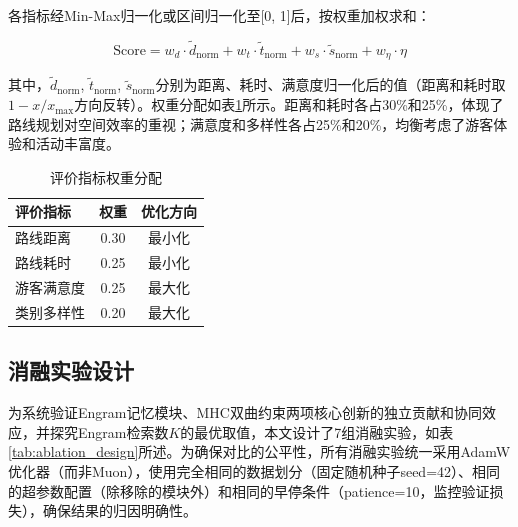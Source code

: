 \documentclass[12pt,a4paper]{ctexart}
\newenvironment{tighttable}
  {\setstretch{1.0}\small}
  {}
\begin{document}
各指标经Min-Max归一化或区间归一化至[0, 1]后，按权重加权求和：

\begin{equation}
\text{Score} = w_d\cdot\tilde{d}_{\text{norm}} + w_t\cdot\tilde{t}_{\text{norm}} + w_s\cdot\tilde{s}_{\text{norm}} + w_\eta\cdot\eta
\label{eq:composite}
\end{equation}

其中，$\tilde{d}_{\text{norm}}$, $\tilde{t}_{\text{norm}}$, $\tilde{s}_{\text{norm}}$分别为距离、耗时、满意度归一化后的值（距离和耗时取$1-x/x_{\max}$方向反转）。权重分配如表\ref{tab:weights}所示。距离和耗时各占30\%和25\%，体现了路线规划对空间效率的重视；满意度和多样性各占25\%和20\%，均衡考虑了游客体验和活动丰富度。

\begin{table}[H]
\centering
\caption{评价指标权重分配}
\label{tab:weights}
\begin{tighttable}
\begin{tabular}{lcc}
\toprule
评价指标 & 权重 & 优化方向 \\
\midrule
路线距离 & 0.30 & 最小化 \\
路线耗时 & 0.25 & 最小化 \\
游客满意度 & 0.25 & 最大化 \\
类别多样性 & 0.20 & 最大化 \\
\bottomrule
\end{tabular}
\end{tighttable}
\end{table}

\subsection{消融实验设计}

为系统验证Engram记忆模块、MHC双曲约束两项核心创新的独立贡献和协同效应，并探究Engram检索数$K$的最优取值，本文设计了7组消融实验，如表\ref{tab:ablation_design}所述。为确保对比的公平性，所有消融实验统一采用AdamW优化器（而非Muon），使用完全相同的数据划分（固定随机种子seed=42）、相同的超参数配置（除移除的模块外）和相同的早停条件（patience=10，监控验证损失），确保结果的归因明确性。
\end{document}
